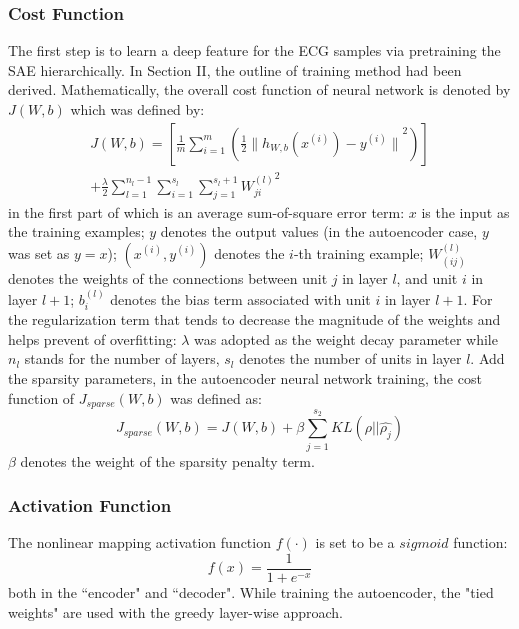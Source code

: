 \documentclass{bmcart}
\begin{document}
\subsubsection*{Cost Function}
The first step is to learn a deep feature for the ECG samples via pretraining the SAE hierarchically. In Section II, the outline of training method had been derived. Mathematically, the overall cost function of neural network is denoted by $J(W, b)$ which was defined by:
\begin{equation}
\begin{split}
J(W,b) = [\frac{1}{m}\sum_{i=1}^m(\frac{1}{2}{\|{h_{W,b}(x^{(i)})} - y^{(i)}\|}^2)] \\
+ \frac{\lambda}{2}\sum_{l=1}^{n_l-1} \sum_{i=1}^{s_l} \sum_{j=1}^{s_l+1}{W_{ji}^{(l)}}^2
\end{split}
\end{equation}
in the first part of which is an average sum-of-square error term: $x$ is the input as the training examples; $y$ denotes the output values (in the autoencoder case, $y$ was set as $y=x$); $(x^{(i)}, y^{(i)})$ denotes the $i$-th training example; $W^{(l)}_{(ij)}$ denotes the weights of the connections between unit $j$ in layer $l$, and unit $i$ in layer $l+1$; $b_i^{(l)}$ denotes the bias term associated with unit $i$ in layer $l+1$. For the regularization term that tends to decrease the magnitude of the weights and helps prevent of overfitting: $\lambda$ was adopted as the weight decay parameter while $n_l$ stands for the number of layers, $s_l$ denotes the number of units in layer $l$.
Add the sparsity parameters, in the autoencoder neural network training, the cost function of $J_{sparse}(W,b)$ was defined as:
\begin{equation}
J_{sparse}(W,b) = J(W,b) + \beta \sum_{j=1}^{s_2}KL(\rho||\hat{\rho_j})
\end{equation}
\noindent $\beta$ denotes the weight of the sparsity penalty term. 


\subsubsection*{Activation Function}
The nonlinear mapping activation function $f(\cdot)$ is set to be a $sigmoid$ function:
\begin{equation}
f(x) = \frac{1}{1+e^{-x}}
\end{equation}
both in the ``encoder" and ``decoder". While training the autoencoder, the "tied weights" are used with the greedy layer-wise approach. 
\end{document}
